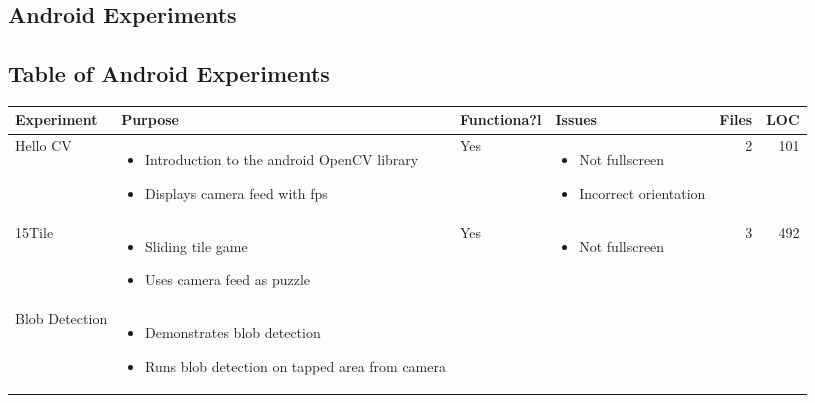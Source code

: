 \appendix
\thispagestyle{empty}
\begin{landscape}
	\section{Android Experiments}\label{app:android_experiments}
		\subsection{Table of Android Experiments}
		\begin{table}[h!]
			\centering
			\label{tab:android_experiments}
			\begin{tabular}{|l|p{0.4\textwidth}|l|p{}|r|r|}
				\hline
				\bfseries Experiment&\bfseries Purpose&\bfseries Functiona?l&\bfseries Issues&\bfseries Files&\bfseries LOC\\
				\hline
				Hello CV&
				\begin{itemize}[noitemsep,topsep=0pt,parsep=0pt]
					\item{Introduction to the android OpenCV library}
					\item{Displays camera feed with fps}
				\end{itemize}&
				Yes&
				\begin{itemize}[noitemsep,topsep=0pt,parsep=0pt]
					\item{Not fullscreen}
					\item{Incorrect orientation}
				\end{itemize}&
				2&
				101\\
				\hline
				15Tile&
				\begin{itemize}[noitemsep,topsep=0pt,parsep=0pt]
					\item{Sliding tile game}
					\item{Uses camera feed as puzzle}
				\end{itemize}&
				Yes&
				\begin{itemize}[noitemsep,topsep=0pt,parsep=0pt]
					\item{Not fullscreen}
				\end{itemize}&
				3&
				492\\
				\hline
				Blob Detection&
				\begin{itemize}[noitemsep,topsep=0pt,parsep=0pt]
					\item{Demonstrates blob detection}
					\item{Runs blob detection on tapped area from camera}
				\end{itemize}&

\end{tabular}
\end{table}
\end{landscape}
